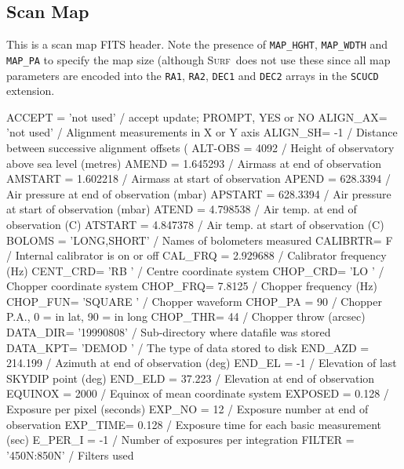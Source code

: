 \documentclass[twoside,11pt,nolof]{starlink}
\providecommand{\scusoft}          {\textsc{Surf}}
\begin{document}
\begin{small}
\subsection{Scan Map}

This is a scan map FITS header. Note the presence of \texttt{MAP\_HGHT},
\texttt{MAP\_WDTH} and \texttt{MAP\_PA} to specify the map size (although
\scusoft\ does not use these since all map parameters are encoded into the
\texttt{RA1}, \texttt{RA2}, \texttt{DEC1} and \texttt{DEC2} arrays in the
\texttt{SCUCD} extension.

\begin{terminalv}
ACCEPT  = 'not used'           / accept update; PROMPT, YES or NO
ALIGN_AX= 'not used'           / Alignment measurements in X or Y axis
ALIGN_SH=                   -1 / Distance between successive alignment offsets (
ALT-OBS =                 4092 / Height of observatory above sea level (metres)
AMEND   =             1.645293 / Airmass at end of observation
AMSTART =             1.602218 / Airmass at start of observation
APEND   =             628.3394 / Air pressure at end of observation (mbar)
APSTART =             628.3394 / Air pressure at start of observation (mbar)
ATEND   =             4.798538 / Air temp. at end of observation (C)
ATSTART =             4.847378 / Air temp. at start of observation (C)
BOLOMS  = 'LONG,SHORT'         / Names of bolometers measured
CALIBRTR=                    F / Internal calibrator is on or off
CAL_FRQ =             2.929688 / Calibrator frequency (Hz)
CENT_CRD= 'RB      '           / Centre coordinate system
CHOP_CRD= 'LO      '           / Chopper coordinate system
CHOP_FRQ=               7.8125 / Chopper frequency (Hz)
CHOP_FUN= 'SQUARE  '           / Chopper waveform
CHOP_PA =                   90 / Chopper P.A., 0 = in lat, 90 = in long
CHOP_THR=                   44 / Chopper throw (arcsec)
DATA_DIR= '19990808'           / Sub-directory where datafile was stored
DATA_KPT= 'DEMOD   '           / The type of data stored to disk
END_AZD =              214.199 / Azimuth at end of observation (deg)
END_EL  =                   -1 / Elevation of last SKYDIP point (deg)
END_ELD =               37.223 / Elevation at end of observation
EQUINOX =                 2000 / Equinox of mean coordinate system
EXPOSED =                0.128 / Exposure per pixel (seconds)
EXP_NO  =                   12 / Exposure number at end of observation
EXP_TIME=                0.128 / Exposure time for each basic measurement (sec)
E_PER_I =                   -1 / Number of exposures per integration
FILTER  = '450N:850N'          / Filters used

\end{terminalv}
\end{small}
\end{document}
